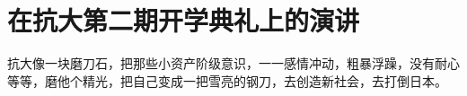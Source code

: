 \section[在抗大第二期开学典礼上的演讲（一九三七年一月二十日）]{在抗大第二期开学典礼上的演讲}


抗大像一块磨刀石，把那些小资产阶级意识，一一感情冲动，粗暴浮躁，没有耐心等等，磨他个精光，把自己变成一把雪亮的钢刀，去创造新社会，去打倒日本。

